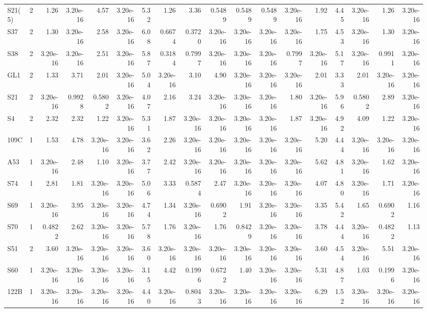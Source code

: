 {\begin{longtable}{lrrrrrrrrrrrrrrrrr}
  S21(5) & 2 & 1.26 & 3.20e-16 & 4.57 & 3.20e-16 & 5.32 & 1.26 & 3.36 & 0.5489 & 0.5489 & 0.5489 & 3.20e-16 & 1.92 & 4.45 & 3.20e-16 & 1.26 & 3.20e-16 \\
  S37 & 2 & 1.30 & 3.20e-16 & 2.58 & 3.20e-16 & 6.08 & 0.6674 & 0.3720 & 3.20e-16 & 3.20e-16 & 3.20e-16 & 3.20e-16 & 1.75 & 4.53 & 3.20e-16 & 1.30 & 3.20e-16 \\
  S38 & 2 & 3.20e-16 & 3.20e-16 & 2.51 & 3.20e-16 & 5.87 & 0.3184 & 0.7997 & 3.20e-16 & 3.20e-16 & 3.20e-16 & 0.7997 & 3.20e-16 & 5.17 & 3.20e-16 & 0.9911 & 3.20e-16 \\
  GL1 & 2 & 1.33 & 3.71 & 2.01 & 3.20e-16 & 5.04 & 3.20e-16 & 3.10 & 4.90 & 3.20e-16 & 3.20e-16 & 3.20e-16 & 2.01 & 3.33 & 2.01 & 3.20e-16 & 3.20e-16 \\
  S21 & 2 & 3.20e-16 & 0.9928 & 0.5802 & 3.20e-16 & 4.07 & 2.16 & 3.24 & 3.20e-16 & 3.20e-16 & 3.20e-16 & 1.80 & 3.20e-16 & 5.96 & 0.5802 & 2.89 & 3.20e-16 \\
  S4 & 2 & 2.32 & 2.32 & 1.22 & 3.20e-16 & 5.31 & 1.87 & 3.20e-16 & 3.20e-16 & 3.20e-16 & 3.20e-16 & 1.87 & 3.20e-16 & 4.92 & 4.09 & 1.22 & 3.20e-16 \\
  109C & 1 & 1.53 & 4.78 & 3.20e-16 & 3.20e-16 & 3.62 & 2.26 & 3.20e-16 & 3.20e-16 & 3.20e-16 & 3.20e-16 & 3.20e-16 & 5.20 & 4.44 & 3.20e-16 & 3.20e-16 & 3.20e-16 \\
  A53 & 1 & 3.20e-16 & 2.48 & 1.10 & 3.20e-16 & 3.77 & 2.42 & 3.20e-16 & 3.20e-16 & 3.20e-16 & 3.20e-16 & 3.20e-16 & 5.62 & 4.81 & 3.20e-16 & 1.62 & 3.20e-16 \\
  S74 & 1 & 2.81 & 1.81 & 3.20e-16 & 3.20e-16 & 5.06 & 3.33 & 0.5874 & 2.47 & 3.20e-16 & 3.20e-16 & 3.20e-16 & 4.07 & 4.80 & 3.20e-16 & 1.71 & 3.20e-16 \\
  S69 & 1 & 3.20e-16 & 3.95 & 3.20e-16 & 3.20e-16 & 4.74 & 1.34 & 3.20e-16 & 0.6902 & 1.91 & 3.20e-16 & 3.20e-16 & 3.35 & 5.42 & 1.65 & 0.6902 & 1.16 \\
  S70 & 1 & 0.4822 & 2.62 & 3.20e-16 & 3.20e-16 & 5.78 & 1.76 & 3.20e-16 & 1.76 & 0.8429 & 3.20e-16 & 3.20e-16 & 3.78 & 4.44 & 3.20e-16 & 0.4822 & 1.13 \\
  S51 & 2 & 3.60 & 3.20e-16 & 3.20e-16 & 3.20e-16 & 3.60 & 3.20e-16 & 3.20e-16 & 3.20e-16 & 3.20e-16 & 3.20e-16 & 3.20e-16 & 3.60 & 4.54 & 3.20e-16 & 5.51 & 3.20e-16 \\
  S60 & 1 & 3.20e-16 & 3.20e-16 & 3.20e-16 & 3.20e-16 & 3.15 & 4.42 & 0.1996 & 0.6722 & 1.40 & 3.20e-16 & 3.20e-16 & 5.31 & 4.87 & 1.03 & 0.1996 & 3.20e-16 \\
  122B & 1 & 3.20e-16 & 3.20e-16 & 3.20e-16 & 3.20e-16 & 4.40 & 3.20e-16 & 0.8043 & 3.20e-16 & 3.20e-16 & 3.20e-16 & 3.20e-16 & 6.29 & 1.52 & 3.20e-16 & 3.20e-16 & 3.20e-16 \\

\end{longtable}}
